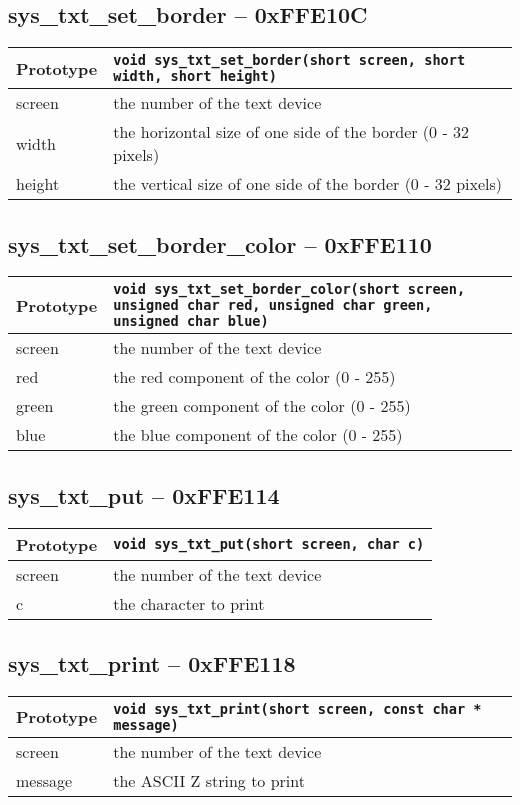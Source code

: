 \subsection*{sys\_txt\_set\_border -- 0xFFE10C}
\begin{tabular}{|l||l|} \hline
Prototype & \lstinline!void sys_txt_set_border(short screen, short width, short height)! \\ \hline
screen & the number of the text device \\ \hline
width & the horizontal size of one side of the border (0 - 32 pixels) \\ \hline
height & the vertical size of one side of the border (0 - 32 pixels) \\ \hline
\end{tabular}

\subsection*{sys\_txt\_set\_border\_color -- 0xFFE110}
\begin{tabular}{|l||l|} \hline
Prototype & \lstinline!void sys_txt_set_border_color(short screen, unsigned char red, unsigned char green, unsigned char blue)! \\ \hline
screen & the number of the text device \\ \hline
red & the red component of the color (0 - 255) \\ \hline
green & the green component of the color (0 - 255) \\ \hline
blue & the blue component of the color (0 - 255) \\ \hline
\end{tabular}

\subsection*{sys\_txt\_put -- 0xFFE114}
\begin{tabular}{|l||l|} \hline
Prototype & \lstinline!void sys_txt_put(short screen, char c)! \\ \hline
screen & the number of the text device \\ \hline
c & the character to print \\ \hline
\end{tabular}

\subsection*{sys\_txt\_print -- 0xFFE118}
\begin{tabular}{|l||l|} \hline
Prototype & \lstinline!void sys_txt_print(short screen, const char * message)! \\ \hline
screen & the number of the text device \\ \hline
message & the ASCII Z string to print \\ \hline
\end{tabular}
